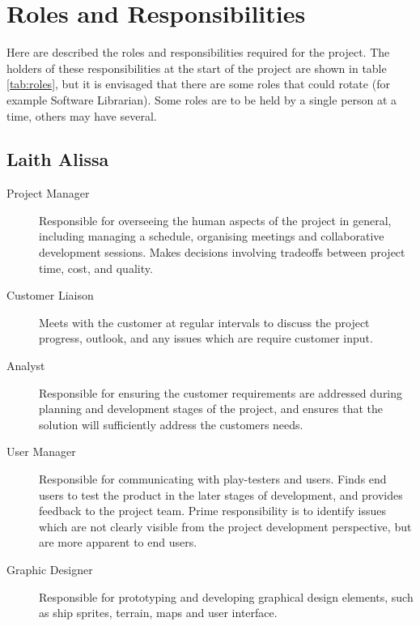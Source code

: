 \section{Roles and Responsibilities}
\label{section:roles}

Here are described the roles and responsibilities required for the project. The holders of these responsibilities at the start of the project are shown in table \ref{tab:roles}, but it is envisaged that there are some roles that could rotate (for example Software Librarian). Some roles are to be held by a single person at a time, others may have several.

\subsection{Laith Alissa}
\begin{description}

    \item[Project Manager] Responsible for overseeing the human aspects of the project in general, including managing a schedule, organising meetings and collaborative development sessions. Makes decisions involving tradeoffs between project time, cost, and quality.
    
    \item[Customer Liaison] Meets with the customer at regular intervals to discuss the project progress, outlook, and any issues which are require customer input. 
 
    \item[Analyst] Responsible for ensuring the customer requirements are addressed during planning and development stages of the project, and ensures that the solution will sufficiently address the customers needs.
     
    \item[User Manager] Responsible for communicating with play-testers and users. Finds end users to test the product in the later stages of development, and provides feedback to the project team. Prime responsibility is to identify issues which are not clearly visible from the project development perspective, but are more apparent to end users. 

	\item[Graphic Designer] Responsible for prototyping and developing graphical design elements, such as ship sprites, terrain, maps and user interface.   
	 
\end{description}


